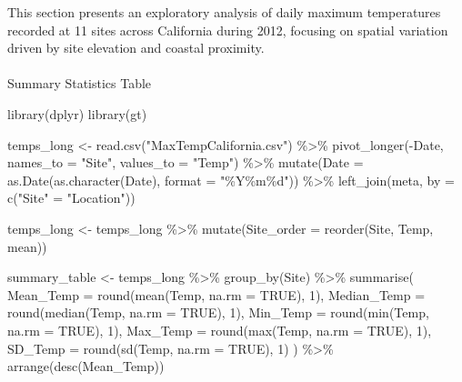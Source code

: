 \documentclass[
  11pt,
]{article}
\makeatletter
\let\oldparagraph\paragraph
\renewcommand{\paragraph}{
    \@ifstar
      \xxxParagraphStar
      \xxxParagraphNoStar
  }
\newcommand{\xxxParagraphStar}[1]{\oldparagraph*{#1}\mbox{}}
\newcommand{\xxxParagraphNoStar}[1]{\oldparagraph{#1}\mbox{}}
\newenvironment{Shaded}{\begin{snugshade}}{\end{snugshade}}
\newcommand{\AttributeTok}[1]{\textcolor[rgb]{0.40,0.45,0.13}{#1}}
\newcommand{\ConstantTok}[1]{\textcolor[rgb]{0.56,0.35,0.01}{#1}}
\newcommand{\DecValTok}[1]{\textcolor[rgb]{0.68,0.00,0.00}{#1}}
\newcommand{\FunctionTok}[1]{\textcolor[rgb]{0.28,0.35,0.67}{#1}}
\newcommand{\NormalTok}[1]{\textcolor[rgb]{0.00,0.23,0.31}{#1}}
\newcommand{\OtherTok}[1]{\textcolor[rgb]{0.00,0.23,0.31}{#1}}
\newcommand{\SpecialCharTok}[1]{\textcolor[rgb]{0.37,0.37,0.37}{#1}}
\newcommand{\StringTok}[1]{\textcolor[rgb]{0.13,0.47,0.30}{#1}}
\makeatother
\begin{document}
This section presents an exploratory analysis of daily maximum
temperatures recorded at 11 sites across California during 2012,
focusing on spatial variation driven by site elevation and coastal
proximity.

\paragraph{Summary Statistics Table}\label{summary-statistics-table}

\begin{Shaded}
\begin{Highlighting}[]
\FunctionTok{library}\NormalTok{(dplyr)}
\FunctionTok{library}\NormalTok{(gt)}

\NormalTok{temps\_long }\OtherTok{\textless{}{-}} \FunctionTok{read.csv}\NormalTok{(}\StringTok{"MaxTempCalifornia.csv"}\NormalTok{) }\SpecialCharTok{\%\textgreater{}\%}
  \FunctionTok{pivot\_longer}\NormalTok{(}\SpecialCharTok{{-}}\NormalTok{Date, }\AttributeTok{names\_to =} \StringTok{"Site"}\NormalTok{, }\AttributeTok{values\_to =} \StringTok{"Temp"}\NormalTok{) }\SpecialCharTok{\%\textgreater{}\%}
  \FunctionTok{mutate}\NormalTok{(}\AttributeTok{Date =} \FunctionTok{as.Date}\NormalTok{(}\FunctionTok{as.character}\NormalTok{(Date), }\AttributeTok{format =} \StringTok{"\%Y\%m\%d"}\NormalTok{)) }\SpecialCharTok{\%\textgreater{}\%}
  \FunctionTok{left\_join}\NormalTok{(meta, }\AttributeTok{by =} \FunctionTok{c}\NormalTok{(}\StringTok{"Site"} \OtherTok{=} \StringTok{"Location"}\NormalTok{))}

\NormalTok{temps\_long }\OtherTok{\textless{}{-}}\NormalTok{ temps\_long }\SpecialCharTok{\%\textgreater{}\%}
  \FunctionTok{mutate}\NormalTok{(}\AttributeTok{Site\_order =} \FunctionTok{reorder}\NormalTok{(Site, Temp, mean))}

\NormalTok{summary\_table }\OtherTok{\textless{}{-}}\NormalTok{ temps\_long }\SpecialCharTok{\%\textgreater{}\%}
  \FunctionTok{group\_by}\NormalTok{(Site) }\SpecialCharTok{\%\textgreater{}\%}
  \FunctionTok{summarise}\NormalTok{(}
    \AttributeTok{Mean\_Temp =} \FunctionTok{round}\NormalTok{(}\FunctionTok{mean}\NormalTok{(Temp, }\AttributeTok{na.rm =} \ConstantTok{TRUE}\NormalTok{), }\DecValTok{1}\NormalTok{),}
    \AttributeTok{Median\_Temp =} \FunctionTok{round}\NormalTok{(}\FunctionTok{median}\NormalTok{(Temp, }\AttributeTok{na.rm =} \ConstantTok{TRUE}\NormalTok{), }\DecValTok{1}\NormalTok{),}
    \AttributeTok{Min\_Temp =} \FunctionTok{round}\NormalTok{(}\FunctionTok{min}\NormalTok{(Temp, }\AttributeTok{na.rm =} \ConstantTok{TRUE}\NormalTok{), }\DecValTok{1}\NormalTok{),}
    \AttributeTok{Max\_Temp =} \FunctionTok{round}\NormalTok{(}\FunctionTok{max}\NormalTok{(Temp, }\AttributeTok{na.rm =} \ConstantTok{TRUE}\NormalTok{), }\DecValTok{1}\NormalTok{),}
    \AttributeTok{SD\_Temp =} \FunctionTok{round}\NormalTok{(}\FunctionTok{sd}\NormalTok{(Temp, }\AttributeTok{na.rm =} \ConstantTok{TRUE}\NormalTok{), }\DecValTok{1}\NormalTok{)}
\NormalTok{  ) }\SpecialCharTok{\%\textgreater{}\%}
  \FunctionTok{arrange}\NormalTok{(}\FunctionTok{desc}\NormalTok{(Mean\_Temp))}


\end{Highlighting}
\end{Shaded}
\end{document}

